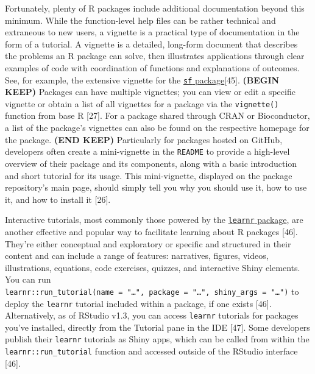 \documentclass[10pt,letterpaper]{article}
\begin{document}
Fortunately, plenty of R packages include additional documentation
beyond this minimum. While the function-level help files can be rather
technical and extraneous to new users, a vignette is a practical type of
documentation in the form of a tutorial. A vignette is a detailed,
long-form document that describes the problems an R package can solve,
then illustrates applications through clear examples of code with
coordination of functions and explanations of outcomes. See, for
example, the extensive vignette for the
\href{https://cran.r-project.org/web/packages/sf/vignettes/sf1.html}{\texttt{sf}
package}{[}45{]}. \textbf{(BEGIN KEEP)} Packages can have multiple
vignettes; you can view or edit a specific vignette or obtain a list of
all vignettes for a package via the \texttt{vignette()} function from
base R {[}27{]}. For a package shared through CRAN or Bioconductor, a
list of the package's vignettes can also be found on the respective
homepage for the package. \textbf{(END KEEP)} Particularly for packages
hosted on GitHub, developers often create a mini-vignette in the
\texttt{README} to provide a high-level overview of their package and
its components, along with a basic introduction and short tutorial for
its usage. This mini-vignette, displayed on the package repository's
main page, should simply tell you why you should use it, how to use it,
and how to install it {[}26{]}.

Interactive tutorials, most commonly those powered by the
\href{https://rstudio.github.io/learnr/}{\texttt{learnr} package}, are
another effective and popular way to facilitate learning about R
packages {[}46{]}. They're either conceptual and exploratory or specific
and structured in their content and can include a range of features:
narratives, figures, videos, illustrations, equations, code exercises,
quizzes, and interactive Shiny elements. You can run
\texttt{learnr::run\_tutorial(name\ =\ "\ldots{}",\ package\ =\ "\ldots{}",\ shiny\_args\ =\ "\ldots{}")}
to deploy the \texttt{learnr} tutorial included within a package, if one
exists {[}46{]}. Alternatively, as of RStudio v1.3, you can access
\texttt{learnr} tutorials for packages you've installed, directly from
the Tutorial pane in the IDE {[}47{]}. Some developers publish their
\texttt{learnr} tutorials as Shiny apps, which can be called from within
the \texttt{learnr::run\_tutorial} function and accessed outside of the
RStudio interface {[}46{]}.
\end{document}
